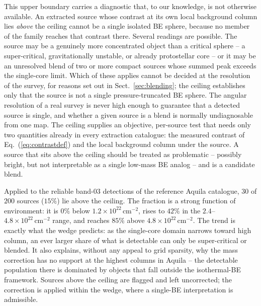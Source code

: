 \documentclass[11pt,a4paper]{article}
\begin{document}
This upper boundary carries a diagnostic that, to our knowledge, is not
otherwise available. An extracted source whose contrast at its own local
background column lies \emph{above} the ceiling cannot be a single isolated BE
sphere, because no member of the family reaches that contrast there. Several
readings are possible. The source may be a genuinely more concentrated object
than a critical sphere -- a super-critical, gravitationally unstable, or
already protostellar core -- or it may be an unresolved blend of two or more
compact sources whose summed peak exceeds the single-core limit. Which of
these applies cannot be decided at the resolution of the survey, for reasons
set out in Sect.~\ref{sec:blending}; the ceiling establishes only that the
source is not a single pressure-truncated BE sphere. The angular resolution of a real survey is never
high enough to guarantee that a detected source is single, and whether a given
source is a blend is normally undiagnosable from one map. The ceiling supplies
an objective, per-source test that needs only two quantities already in every
extraction catalogue: the measured contrast of Eq.~(\ref{eq:contrastdef}) and
the local background column under the source. A source that sits above the
ceiling should be treated as problematic -- possibly bright, but not
interpretable as a single low-mass BE analog -- and is a candidate blend.

Applied to the reliable band-03 detections of the reference Aquila catalogue,
$30$ of $200$ sources ($15\%$) lie above the ceiling. The fraction is a strong
function of environment: it is $0\%$ below
$1.2\times10^{22}\,\mathrm{cm^{-2}}$, rises to $42\%$ in the
$2.4$--$4.8\times10^{22}\,\mathrm{cm^{-2}}$ range, and reaches $85\%$ above
$4.8\times10^{22}\,\mathrm{cm^{-2}}$. The trend is exactly what the wedge
predicts: as the single-core domain narrows toward high column, an ever larger
share of what is detectable can only be super-critical or blended. It also
explains, without any appeal to grid sparsity, why the mass correction has no
support at the highest columns in Aquila -- the detectable population there is
dominated by objects that fall outside the isothermal-BE framework. Sources
above the ceiling are flagged and left uncorrected; the correction is applied
within the wedge, where a single-BE interpretation is admissible.
\end{document}
